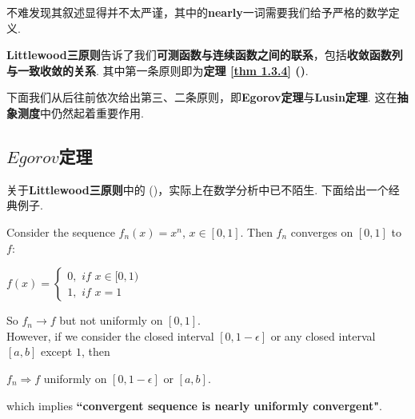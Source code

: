 	\vspace{1em}
	
	不难发现其叙述显得并不太严谨，其中的\textbf{nearly}一词需要我们给予严格的数学定义. 
	
	\vspace{1em}
	
	\textbf{Littlewood三原则}告诉了我们\textbf{可测函数与连续函数之间的联系}，包括\textbf{收敛函数列与一致收敛的关系}. 其中第一条原则即为\textbf{定理 \ref{thm 1.3.4} ()}. 
	
	\vspace{1em}
	
	下面我们从后往前依次给出第三、二条原则，即\textbf{Egorov定理}与\textbf{Lusin定理}. 这在\textbf{抽象测度}中仍然起着重要作用.
	
\vspace{4em}
\subsection{$Egorov$定理}
	关于\textbf{Littlewood三原则}中的 ()，实际上在数学分析中已不陌生. 下面给出一个经典例子.
	
	\vspace{2em}
	
	\begin{example}\label{ex 3.8.1}
		Consider the sequence $f_{n}(x) = x^{n}$, $x \in [0 , 1]$. Then $f_n$ converges on $[0 , 1]$ to $f$:
		\begin{center}
			$f(x) = 
			\begin{cases}
				0 , \,\, if \,\, x \in [0 , 1) \\
				1 , \,\, if \,\, x = 1
			\end{cases}$
		\end{center}
		So $f_n \to f$ but not uniformly on $[0 , 1]$. \\
		However, if we consider the closed interval $[0 , 1 - \epsilon]$ or any closed interval $[a , b]$ except $1$, then
		\begin{center}
			$f_n \Rightarrow f$ uniformly on $[0 , 1 - \epsilon]$ or $[a , b]$.
		\end{center}
		which implies \textbf{``convergent sequence is nearly uniformly convergent"}.
	\end{example}

	\newpage

